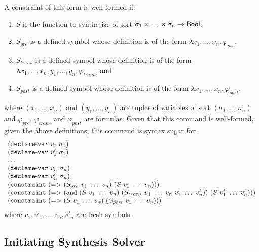 \documentclass[english,a4paper,10pt]{article}
\begin{document}
\begin{itemize}
A constraint of this form is well-formed if:
\begin{enumerate}
\item
$S$ is the function-to-synthesize
of sort $\sigma_1 \times \ldots \times \sigma_n \rightarrow \mathsf{Bool}$,
\item
$S_{pre}$ is a defined symbol 
whose definition is of the form $\lambda x_1, \ldots, x_n.\, \varphi_{pre}$,
\item
$S_{trans}$ is a defined symbol 
whose definition is of the form $\lambda x_1, \ldots, x_n, y_1, \ldots, y_n.\, \varphi_{trans}$, and
\item
$S_{post}$ is a defined symbol 
whose definition is of the form $\lambda x_1, \ldots, x_n.\, \varphi_{post}$.
\end{enumerate}
where $(x_1, \ldots, x_n)$ and $(y_1, \ldots, y_n)$
are tuples of variables of sort $(\sigma_1, \ldots, \sigma_n)$ and
$\varphi_{pre}$, $\varphi_{trans}$ and $\varphi_{post}$ are formulas.
Given that this command is well-formed, given the above definitions,
this command is syntax sugar for:
\[
\begin{array}{l}
{\tt (}{\tt declare\mbox{-}var}\mbox{ }v_1\mbox{ }\sigma_1{\tt )}\\
{\tt (}{\tt declare\mbox{-}var}\mbox{ }v'_1\mbox{ }\sigma_1{\tt )}\\
\ldots\\
{\tt (}{\tt declare\mbox{-}var}\mbox{ }v_n\mbox{ }\sigma_n{\tt )}\\
{\tt (}{\tt declare\mbox{-}var}\mbox{ }v'_n\mbox{ }\sigma_n{\tt )}\\
{\tt (}{\tt constraint}\mbox{ }{\tt (}{\tt =>}\mbox{ }
{\tt (}S_{pre}\mbox{ }v_1\mbox{ }\ldots\mbox{ }v_n{\tt )}\mbox{ }
{\tt (}S\mbox{ }v_1\mbox{ }\ldots\mbox{ }v_n{\tt )}{\tt )}{\tt )}\\
{\tt (}{\tt constraint}\mbox{ }{\tt (}{\tt =>}\mbox{ }
{\tt (}{\tt and}\mbox{ }{\tt (}S\mbox{ }v_1\mbox{ }\ldots\mbox{ }v_n{\tt )}\mbox{ }
{\tt (}S_{trans}\mbox{ }v_1\mbox{ }\ldots\mbox{ }v_n\mbox{ }v'_1\mbox{ }\ldots\mbox{ }v'_n{\tt )}{\tt )}\mbox{ }
{\tt (}S\mbox{ }v'_1\mbox{ }\ldots\mbox{ }v'_n{\tt )}{\tt )}{\tt )}\\
{\tt (}{\tt constraint}\mbox{ }{\tt (}{\tt =>}\mbox{ }
{\tt (}S\mbox{ }v_1\mbox{ }\ldots\mbox{ }v_n{\tt )}\mbox{ }
{\tt (}S_{post}\mbox{ }v_1\mbox{ }\ldots\mbox{ }v_n{\tt )}{\tt )}{\tt )}\\
\end{array}
\]
where $v_1, v'_1, \ldots, v_n, v'_n$ are fresh symbols.

\end{itemize}

\subsection{Initiating Synthesis Solver}
\end{document}
